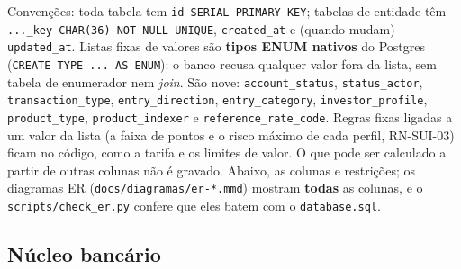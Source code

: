 \documentclass[11pt,a4paper]{article}
\newcommand{\tb}[1]{\texttt{#1}}           %
\begin{document}
Convenções: toda tabela tem \tb{id SERIAL PRIMARY KEY}; tabelas de entidade têm
\tb{..._key CHAR(36) NOT NULL UNIQUE}, \tb{created_at} e (quando mudam) \tb{updated_at}. Listas
fixas de valores são \textbf{tipos ENUM nativos} do Postgres (\tb{CREATE TYPE ... AS ENUM}): o banco
recusa qualquer valor fora da lista, sem tabela de enumerador nem \emph{join}. São nove:
\tb{account_status}, \tb{status_actor}, \tb{transaction_type}, \tb{entry_direction},
\tb{entry_category}, \tb{investor_profile}, \tb{product_type}, \tb{product_indexer} e
\tb{reference_rate_code}. Regras fixas ligadas a um valor da lista (a faixa de pontos e o risco
máximo de cada perfil, RN-SUI-03) ficam no código, como a tarifa e os limites de valor. O que pode ser calculado a partir de outras colunas não é gravado.
Abaixo, as colunas e restrições; os diagramas ER (\tb{docs/diagramas/er-*.mmd}) mostram
\textbf{todas} as colunas, e o \tb{scripts/check_er.py} confere que eles batem com o
\tb{database.sql}.

\subsection{Núcleo bancário}
\end{document}
